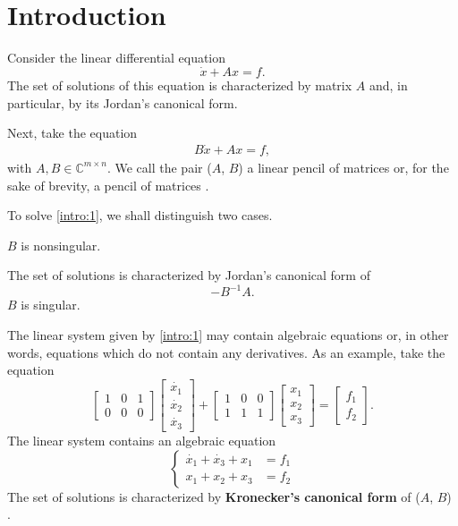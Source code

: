 \section{Introduction}
Consider the linear differential equation
\[
	\dot{x} + Ax = f.
\]
The set of solutions of this equation is characterized by matrix $A$ and, in particular, by its Jordan's canonical form.

Next, take the equation
\begin{gather} \label{intro:1}
	B\dot{x} + Ax = f,
\end{gather}
with $A, B \in \mathbb{C}^{m \times n}$. We call the pair ($A$, $B$) a linear pencil of matrices or, for the sake of brevity,
a pencil of matrices \cite{ikramov}.

To solve \eqref{intro:1}, we shall distinguish two cases.
\begin{cs}
	\case $B$ is nonsingular.

		The set of solutions is characterized by Jordan's canonical form of \[-B^{-1}A.\]
	\case $B$ is singular.

		The linear system given by \eqref{intro:1} may contain algebraic equations or, in other words, equations which do
		not contain any derivatives. As an example, take the equation
		\[
			\begin{bmatrix}
				1 & 0 & 1 \\
				0 & 0 & 0
			\end{bmatrix}
			\begin{bmatrix}
				\dot{x_1} \\
				\dot{x_2} \\
				\dot{x_3}
			\end{bmatrix} + 
			\begin{bmatrix}
				1 & 0 & 0 \\
				1 & 1 & 1
			\end{bmatrix}
			\begin{bmatrix}
				x_1 \\
				x_2 \\
				x_3
			\end{bmatrix}
			= \begin{bmatrix}
				f_1 \\
				f_2
			\end{bmatrix}.
		\]
		The linear system contains an algebraic equation
		\begin{equation*}
			\left\{
				\begin{aligned}
					\dot{x_1} + \dot{x_3} + x_1 &= f_1 \\
					x_1 + x_2 + x_3 &= f_2
				\end{aligned}
			\right.
		\end{equation*}
		The set of solutions is characterized by \textbf{Kronecker's canonical form} of ($A$, $B$)
		\cite{gantmacher, kunkel-mehrmann}.
\end{cs}
\vspace{5mm}

